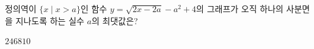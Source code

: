 \hspace*{2mm}\begin{minipage}[t]{\dimexpr\linewidth-2mm\relax}\vspace{0pt}
정의역이 $\{x\mid x>a\}$인 함수 $y=\sqrt{2x-2a}-a^2+4$의 그래프가 오직 하나의 사분면을 지나도록 하는 실수 $a$의 최댓값은?
\begin{choices32}{$2$}{$4$}{$6$}{$8$}{$10$}\end{choices32}\end{minipage}
